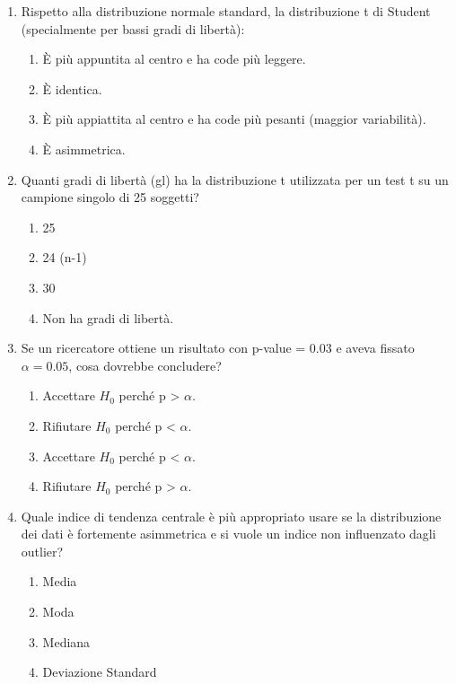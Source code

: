 \documentclass[12pt, a4paper]{article}
\begin{document}
\begin{enumerate}
    \item Rispetto alla distribuzione normale standard, la distribuzione t di Student (specialmente per bassi gradi di libertà):
    \begin{enumerate}
        \item È più appuntita al centro e ha code più leggere.
        \item È identica.
        \item È più appiattita al centro e ha code più pesanti (maggior variabilità).
        \item È asimmetrica.
    \end{enumerate}

    \item Quanti gradi di libertà (gl) ha la distribuzione t utilizzata per un test t su un campione singolo di 25 soggetti?
    \begin{enumerate}
        \item 25
        \item 24 (n-1)
        \item 30
        \item Non ha gradi di libertà.
    \end{enumerate}

    \item Se un ricercatore ottiene un risultato con p-value = 0.03 e aveva fissato $\alpha = 0.05$, cosa dovrebbe concludere?
    \begin{enumerate}
        \item Accettare $H_0$ perché p > $\alpha$.
        \item Rifiutare $H_0$ perché p < $\alpha$.
        \item Accettare $H_0$ perché p < $\alpha$.
        \item Rifiutare $H_0$ perché p > $\alpha$.
    \end{enumerate}

    \item Quale indice di tendenza centrale è più appropriato usare se la distribuzione dei dati è fortemente asimmetrica e si vuole un indice non influenzato dagli outlier?
    \begin{enumerate}
        \item Media
        \item Moda
        \item Mediana
        \item Deviazione Standard
    \end{enumerate}

\end{enumerate} %
\end{document}
